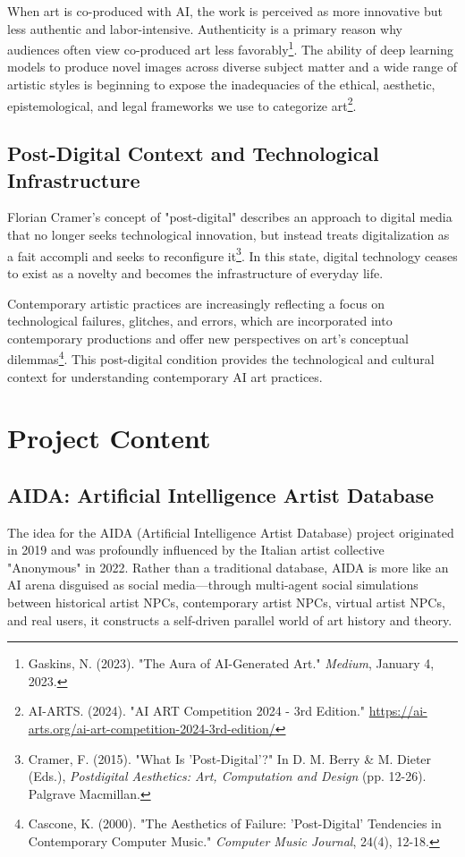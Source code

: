 \documentclass{article}
\begin{document}
When art is co-produced with AI, the work is perceived as more innovative but less authentic and labor-intensive. Authenticity is a primary reason why audiences often view co-produced art less favorably\footnote{Gaskins, N. (2023). "The Aura of AI-Generated Art." \textit{Medium}, January 4, 2023.}. The ability of deep learning models to produce novel images across diverse subject matter and a wide range of artistic styles is beginning to expose the inadequacies of the ethical, aesthetic, epistemological, and legal frameworks we use to categorize art\footnote{AI-ARTS. (2024). "AI ART Competition 2024 - 3rd Edition." \url{https://ai-arts.org/ai-art-competition-2024-3rd-edition/}}.

\subsection{Post-Digital Context and Technological Infrastructure}

Florian Cramer's concept of "post-digital" describes an approach to digital media that no longer seeks technological innovation, but instead treats digitalization as a fait accompli and seeks to reconfigure it\footnote{Cramer, F. (2015). "What Is 'Post-Digital'?" In D. M. Berry \& M. Dieter (Eds.), \textit{Postdigital Aesthetics: Art, Computation and Design} (pp. 12-26). Palgrave Macmillan.}. In this state, digital technology ceases to exist as a novelty and becomes the infrastructure of everyday life.

Contemporary artistic practices are increasingly reflecting a focus on technological failures, glitches, and errors, which are incorporated into contemporary productions and offer new perspectives on art's conceptual dilemmas\footnote{Cascone, K. (2000). "The Aesthetics of Failure: 'Post-Digital' Tendencies in Contemporary Computer Music." \textit{Computer Music Journal}, 24(4), 12-18.}. This post-digital condition provides the technological and cultural context for understanding contemporary AI art practices.

\section{Project Content}

\subsection{AIDA: Artificial Intelligence Artist Database}

The idea for the AIDA (Artificial Intelligence Artist Database) project originated in 2019 and was profoundly influenced by the Italian artist collective "Anonymous" in 2022. Rather than a traditional database, AIDA is more like an AI arena disguised as social media—through multi-agent social simulations between historical artist NPCs, contemporary artist NPCs, virtual artist NPCs, and real users, it constructs a self-driven parallel world of art history and theory.
\end{document}
